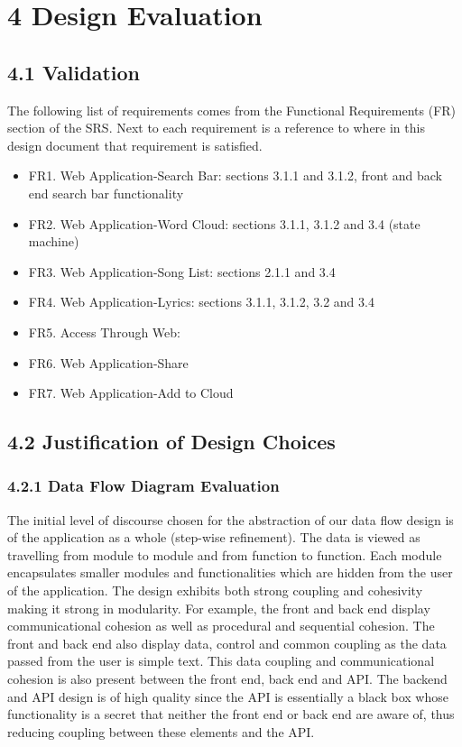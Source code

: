 \documentclass[]{article}
\begin{document}
\section{4 Design Evaluation}\label{design-evaluation}

\subsection{4.1 Validation}\label{validation}

The following list of requirements comes from the Functional
Requirements (FR) section of the SRS. Next to each requirement is a
reference to where in this design document that requirement is
satisfied.

\begin{itemize}
\itemsep1pt\parskip0pt
\item
  FR1. Web Application-Search Bar: sections 3.1.1 and 3.1.2, front and
  back end search bar functionality
\item
  FR2. Web Application-Word Cloud: sections 3.1.1, 3.1.2 and 3.4 (state
  machine)
\item
  FR3. Web Application-Song List: sections 2.1.1 and 3.4
\item
  FR4. Web Application-Lyrics: sections 3.1.1, 3.1.2, 3.2 and 3.4
\item
  FR5. Access Through Web:
\item
  FR6. Web Application-Share
\item
  FR7. Web Application-Add to Cloud
\end{itemize}

\subsection{4.2 Justification of Design
Choices}\label{justification-of-design-choices}

\subsubsection{4.2.1 Data Flow Diagram
Evaluation}\label{data-flow-diagram-evaluation}

The initial level of discourse chosen for the abstraction of our data
flow design is of the application as a whole (step-wise refinement). The
data is viewed as travelling from module to module and from function to
function. Each module encapsulates smaller modules and functionalities
which are hidden from the user of the application. The design exhibits
both strong coupling and cohesivity making it strong in modularity. For
example, the front and back end display communicational cohesion as well
as procedural and sequential cohesion. The front and back end also
display data, control and common coupling as the data passed from the
user is simple text. This data coupling and communicational cohesion is
also present between the front end, back end and API. The backend and
API design is of high quality since the API is essentially a black box
whose functionality is a secret that neither the front end or back end
are aware of, thus reducing coupling between these elements and the API.
\end{document}
